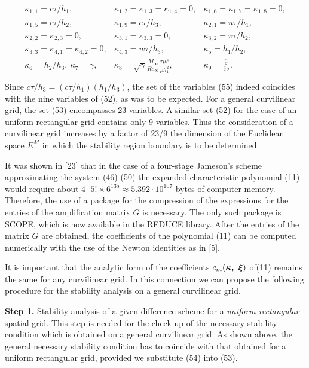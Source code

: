 \begin{eqnarray}
\left. \begin{array}{lll}
\kappa_{1,1} = c\tau/h_1,&\kappa_{1,2}=\kappa_{1,3}=\kappa_{1,4}=0,&
\kappa_{1,6}=\kappa_{1,7}=\kappa_{1,8}=0,\\
\kappa_{1,5}=c\tau/h_2,&\kappa_{1,9}=c\tau/h_3,&\kappa_{2,1}=u\tau/h_1,\\
\kappa_{2,2}=\kappa_{2,3}=0,&\kappa_{3,1}=\kappa_{3,3}=0,&\kappa_{3,2}=
v\tau/h_2,\\
\kappa_{3,3}=\kappa_{4,1}=\kappa_{4,2}=0,&\kappa_{4,3}=w\tau/h_3,&\kappa_5=
h_1/h_2,\\
\kappa_6=h_2/h_3,~\kappa_7=\gamma,&
\kappa_8=\sqrt{\gamma}\frac{M_{\infty}}{Re_{\infty}}\frac{\tau \mu \bar
{\varepsilon}}{\rho h_1^2},&\kappa_9=\frac{\tilde{\varepsilon}}
{\bar{\varepsilon}\sigma}.\\
\end{array} \right.
\end{eqnarray}
Since $c\tau/h_3=(c\tau/h_1)(h_1/h_3)$, the set of the variables (55)
indeed coincides with the nine variables of (52), as was to be
expected. For a general curvilinear grid, the set (53) encompasses 23
variables. A similar set (52) for the case of an uniform rectangular grid
contains only 9 variables. Thus the consideration of a curvilinear grid
increases by a factor of 23/9 the dimension of the Euclidean space $E^M$ in
which the stability region boundary is to be determined.

   It was shown in [23] that in the case of a four-stage Jameson's scheme
approximating the system (46)-(50) the expanded characteristic polynomial (11)
would require about $4\cdot 5!\times 6^{135}\approx 5.392\cdot 10^{107}$
bytes of computer memory. Therefore, the use of a package for the compression
of the expressions for the entries of the amplification matrix $G$ is
necessary. The only such package is SCOPE, which is now available in the
REDUCE library. After the entries of the matrix $G$ are obtained, the
coefficients of the polynomial (11) can be computed numerically with the use
of the Newton identities as in [5].

   It is important that the analytic form of the coefficients
$c_m(\mbox{\boldmath$\kappa,~\xi$\unboldmath})$ of(11) remains the same for
any curvilinear grid. In this connection we can propose the following
procedure for the stability analysis on a general curvilinear grid.

   {\bf Step 1.} Stability analysis of a given difference scheme for a
{\em uniform rectangular} spatial grid. This step is needed for the
check-up of the necessary stability condition which is obtained on a
general curvilinear grid. As shown above, the general necessary
stability condition has to coincide with that obtained for a uniform
rectangular grid, provided we substitute (54) into (53).

